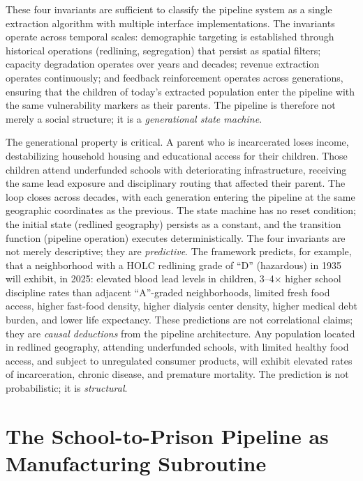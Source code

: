 These four invariants are sufficient to classify the pipeline system as a single extraction algorithm with multiple interface implementations. The invariants operate across temporal scales: demographic targeting is established through historical operations (redlining, segregation) that persist as spatial filters; capacity degradation operates over years and decades; revenue extraction operates continuously; and feedback reinforcement operates across generations, ensuring that the children of today's extracted population enter the pipeline with the same vulnerability markers as their parents. The pipeline is therefore not merely a social structure; it is a \textit{generational state machine}.

The generational property is critical. A parent who is incarcerated loses income, destabilizing household housing and educational access for their children. Those children attend underfunded schools with deteriorating infrastructure, receiving the same lead exposure and disciplinary routing that affected their parent. The loop closes across decades, with each generation entering the pipeline at the same geographic coordinates as the previous. The state machine has no reset condition; the initial state (redlined geography) persists as a constant, and the transition function (pipeline operation) executes deterministically. The four invariants are not merely descriptive; they are \textit{predictive}. The framework predicts, for example, that a neighborhood with a HOLC redlining grade of ``D'' (hazardous) in 1935 will exhibit, in 2025: elevated blood lead levels in children, 3--4$\times$ higher school discipline rates than adjacent ``A''-graded neighborhoods, limited fresh food access, higher fast-food density, higher dialysis center density, higher medical debt burden, and lower life expectancy. These predictions are not correlational claims; they are \textit{causal deductions} from the pipeline architecture. Any population located in redlined geography, attending underfunded schools, with limited healthy food access, and subject to unregulated consumer products, will exhibit elevated rates of incarceration, chronic disease, and premature mortality. The prediction is not probabilistic; it is \textit{structural}.

\section{The School-to-Prison Pipeline as Manufacturing Subroutine}
\label{sec:school_to_prison}

